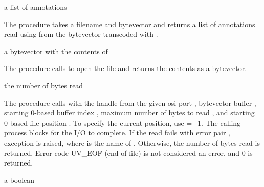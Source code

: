 \begin{procedure}
\end{procedure}
\returns{} a list of annotations

The  procedure takes a filename  and
 bytevector and returns a list of annotations read using
 from the  bytevector
transcoded with .

\begin{procedure}
\end{procedure}
\returns{} a bytevector with the contents of 

The  procedure calls  to open the file  and returns the contents
as a bytevector.

\begin{procedure}
\end{procedure}
\returns{} the number of bytes read

The  procedure calls  with
the handle from the given osi-port , bytevector buffer
, starting 0-based buffer index , maximum number of
bytes to read , and starting 0-based file position . To
specify the current position, use =$-1$. The calling process
blocks for the I/O to complete. If the read fails with error pair
, exception  is raised, where  is
the name of . Otherwise, the number of bytes read is
returned. Error code UV\_EOF (end of file) is not considered an error,
and 0 is returned.

\begin{procedure}
\end{procedure}
\returns{} a boolean


